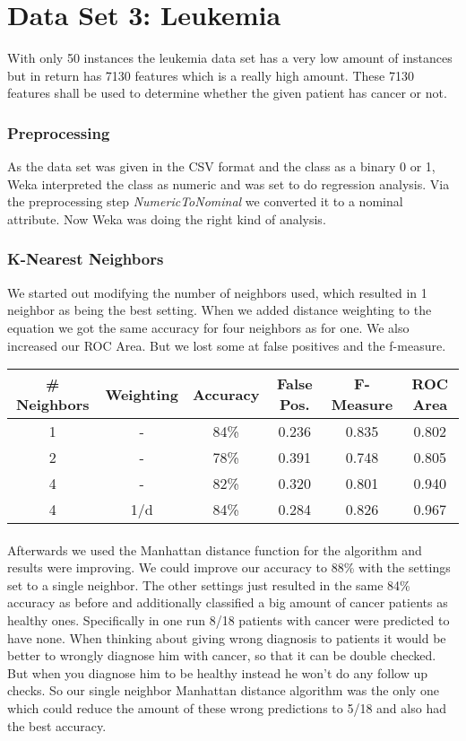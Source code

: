 \documentclass{article}
\begin{document}
\section{Data Set 3: Leukemia}
With only 50 instances the leukemia data set has a very low amount of instances but in return has 7130 features which is a really high amount. These 7130 features shall be used to determine whether the given patient has cancer or not.  \\
\subsubsection{Preprocessing}
As the data set was given in the CSV format and the class as a binary 0 or 1, Weka interpreted the class as numeric and was set to do regression analysis. Via the preprocessing step \emph{NumericToNominal} we converted it to a nominal attribute. Now Weka was doing the right kind of analysis.
\subsubsection{K-Nearest Neighbors}
We started out modifying the number of neighbors used, which resulted in 1 neighbor as being the best setting. When we added distance weighting to the equation we got the same accuracy for four neighbors as for one. We also increased our ROC Area.  But we lost some at false positives and the f-measure. \\

\begin{center}
\begin{tabular}{ c | c | c | c | c | c }
\textbf{\# Neighbors} & \textbf{Weighting} & \textbf{Accuracy} & \textbf{False Pos.} & \textbf{F-Measure} & \textbf{ROC Area}\\
\hline
1 & - & 84\% & 0.236 & 0.835 &  0.802\\
2 & - & 78\% & 0.391 & 0.748 & 0.805\\
4 & - & 82\% & 0.320 & 0.801 & 0.940\\
4 & 1/d &  84\% & 0.284 & 0.826 & 0.967\\
\end{tabular}
\end{center}

\paragraph{}Afterwards we used the Manhattan distance function for the algorithm and results were improving. We could improve our accuracy to 88\% with the settings set to a single neighbor. The other settings just resulted in the same 84\% accuracy as before and additionally classified a big amount of cancer patients as healthy ones. Specifically in one run 8/18 patients with cancer were predicted to have none. When thinking about giving wrong diagnosis to patients it would be better to wrongly diagnose him with cancer, so that it can be double checked. But when you diagnose him to be healthy instead he won't do any follow up checks. So our single neighbor Manhattan distance algorithm was the only one which could reduce the amount of these wrong predictions to 5/18 and also had the best accuracy.
\end{document}
